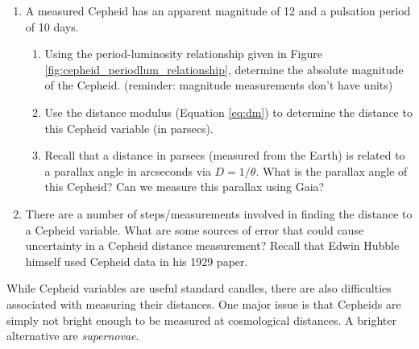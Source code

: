 \documentclass[11pt]{article}
\begin{document}
\begin{enumerate}[resume]
    \item A measured Cepheid has an apparent magnitude of 12 and a pulsation period of 10 days. 
    \begin{enumerate}
        \item Using the period-luminosity relationship given in Figure \ref{fig:cepheid_periodlum_relationship}, determine the absolute magnitude of the Cepheid. (reminder: magnitude measurements don't have units)
        
        \item Use the distance modulus (Equation \ref{eq:dm}) to determine the distance to this Cepheid variable (in parsecs).
        
        \item Recall that a distance in parsecs (measured from the Earth) is related to a parallax angle in arcseconds via $D = 1/\theta$. What is the parallax angle of this Cepheid? Can we measure this parallax using Gaia?
    \end{enumerate} 
    
    
    \item There are a number of steps/measurements involved in finding the distance to a Cepheid variable. What are some sources of error that could cause uncertainty in a Cepheid distance measurement? Recall that Edwin Hubble himself used Cepheid data in his 1929 paper. 
\end{enumerate}


\medskip \noindent
While Cepheid variables are useful standard candles, there are also difficulties associated with measuring their distances. One major issue is that Cepheids are simply not bright enough to be measured at cosmological distances. A brighter alternative are \emph{supernovae}.
\end{document}
